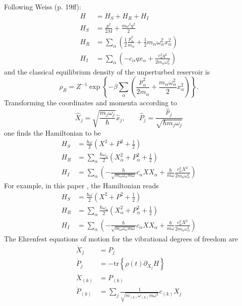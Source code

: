 \documentclass{article}
\newcommand{\tr}[1]{\mathrm{tr}\left\{#1\right\}}
\begin{document}
Following Weiss (p. 19ff): 
\begin{align*}
	H &= H_S + H_R + H_I\\
	H_S &= \frac{p^2}{2M} + \frac{m\omega^2 q^2}{2} \\
	H_R &= \sum_\alpha \left(\frac{1}{2} \frac{p_\alpha^2}{m_\alpha} + \frac{1}{2}m_\alpha \omega_\alpha^2 x_\alpha^2 \right)\\
	H_I &= \sum_\alpha \left(-c_\alpha q x_\alpha + \frac{c_\alpha^2 q^2}{2m_\alpha \omega_\alpha^2} \right)
\end{align*}
and the classical equilibrium density of the unperturbed reservoir is 
\begin{equation*}
	\rho_R=Z^{-1} \exp\left\{-\beta \sum_\alpha \left(\frac{p_\alpha^2}{2m_\alpha} + \frac{m_\alpha \omega_\alpha^2}{2}x_\alpha^2\right)\right\}.
\end{equation*}
Transforming the coordinates and momenta according to 
\begin{equation}
	\hat{X}_j = \sqrt{\frac{m_j\omega_j}{\hbar}} \hat{x}_j, \qquad \hat{P}_j = \frac{\hat{p}_j}{\sqrt{\hbar m_j\omega_j}}
\end{equation}
one finds the Hamiltonian to be 
\begin{align*}
	H_S &= \frac{\hbar \omega}{2}\left(X^2 + P^2 + \frac{1}{2}\right) \\
	H_R &= \sum_\alpha \frac{\hbar \omega_\alpha}{2} \left(X_\alpha^2  + P_\alpha^2 + \frac{1}{2}\right)\\
	H_I &= \sum_\alpha \left(-\frac{\hbar}{\sqrt{m_\alpha \omega_\alpha m\omega}}c_\alpha X X_\alpha + \frac{\hbar}{m \omega}\frac{c_\alpha^2 X^2}{2m_\alpha \omega_\alpha^2} \right)
\end{align*}
For example, in this paper \cite{kab2004statistical}, the Hamiltonian reads
\begin{align*}
	H_S &= \frac{\hbar \omega}{2}\left(X^2 + P^2 + \frac{1}{2}\right) \\
	H_R &= \sum_\alpha \frac{\hbar \omega_\alpha}{2} \left(X_\alpha^2  + P_\alpha^2 + \frac{1}{2}\right)\\
	H_I &= \sum_\alpha \left(-\frac{\hbar}{\sqrt{m_\alpha \omega_\alpha m\omega}}c_\alpha X X_\alpha + \frac{\hbar}{m \omega}\frac{c_\alpha^2 X^2}{2m_\alpha \omega_\alpha^2} \right)
\end{align*}
The Ehrenfest equations of motion for the vibrational degrees of freedom are
\begin{align*}
	\dot{X}_j &= P_j \\
	\dot{P}_j &= -\tr{\rho(t)\partial_{X_j} H}  \\
	\dot{X}_{(k)} &= P_{(k)} \\
	\dot{P}_{(k)} &= \sum_j \frac{1}{\sqrt{m_{(k)}\omega_{(k)} m\omega^3}}c_{(k)} X_j 
\end{align*}

\printbibliography
\end{document}
